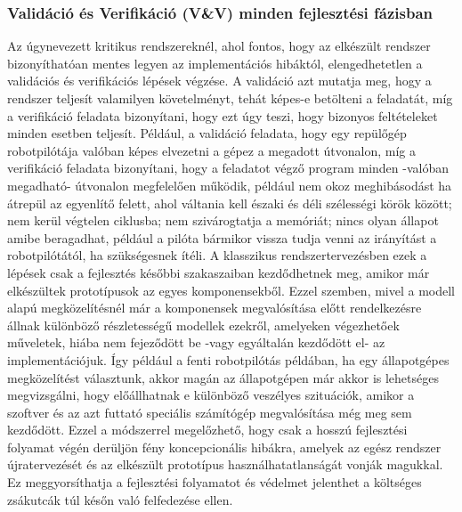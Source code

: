         \subsubsection{Validáció és Verifikáció (V\&V) minden fejlesztési fázisban}
        Az úgynevezett kritikus rendszereknél, ahol fontos, hogy az elkészült rendszer bizonyíthatóan mentes legyen az implementációs hibáktól, elengedhetetlen a validációs és verifikációs lépések végzése. A validáció azt mutatja meg, hogy a rendszer teljesít valamilyen követelményt, tehát képes-e betölteni a feladatát, míg a verifikáció feladata bizonyítani, hogy ezt úgy teszi, hogy bizonyos feltételeket minden esetben teljesít. Például, a validáció feladata, hogy egy repülőgép robotpilótája valóban képes elvezetni a gépez a megadott útvonalon, míg a verifikáció feladata bizonyítani, hogy a feladatot végző program minden -valóban megadható- útvonalon megfelelően működik, például nem okoz meghibásodást ha átrepül az egyenlítő felett, ahol váltania kell északi és déli szélességi körök között; nem kerül végtelen ciklusba; nem szivárogtatja a memóriát; nincs olyan állapot amibe beragadhat, például a pilóta bármikor vissza tudja venni az irányítást a robotpilótától, ha szükségesnek ítéli.
        A klasszikus rendszertervezésben ezek a lépések csak a fejlesztés későbbi szakaszaiban kezdődhetnek meg, amikor már elkészültek prototípusok az egyes komponensekből.
        Ezzel szemben, mivel a modell alapú megközelítésnél már a komponensek megvalósítása előtt rendelkezésre állnak különböző részletességű modellek ezekről, amelyeken végezhetőek műveletek, hiába nem fejeződött be -vagy egyáltalán kezdődött el- az implementációjuk.
        Így például a fenti robotpilótás példában, ha egy állapotgépes megközelítést választunk, akkor magán az állapotgépen már akkor is lehetséges megvizsgálni, hogy előállhatnak e különböző veszélyes szituációk, amikor a szoftver és az azt futtató speciális számítógép megvalósítása még meg sem kezdődött.
        Ezzel a módszerrel megelőzhető, hogy csak a hosszú fejlesztési folyamat végén derüljön fény koncepcionális hibákra, amelyek az egész rendszer újratervezését és az elkészült prototípus használhatatlanságát vonják magukkal.
        Ez meggyorsíthatja a fejlesztési folyamatot és védelmet jelenthet a költséges zsákutcák túl későn való felfedezése ellen.
        
